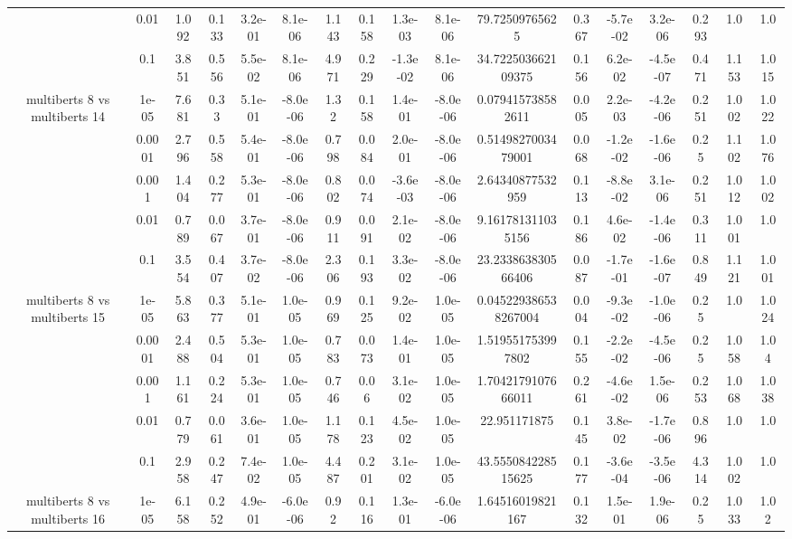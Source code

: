 \begin{tabular}{|c|c|c|c|c|c|c|c|c|c|c|c|c|c|c|c|c|}
 & 0.01 & 1.092 & 0.133 & 3.2e-01 & 8.1e-06 & 1.143 & 0.158 & 1.3e-03 & 8.1e-06 & 79.72509765625 & 0.367 & -5.7e-02 & 3.2e-06 & 0.293 & 1.0 & 1.0 \\
 & 0.1 & 3.851 & 0.556 & 5.5e-02 & 8.1e-06 & 4.971 & 0.229 & -1.3e-02 & 8.1e-06 & 34.722503662109375 & 0.156 & 6.2e-02 & -4.5e-07 & 0.471 & 1.153 & 1.015 \\
\hline
\multirow{5}{*}{multiberts 8 vs multiberts 14} & 1e-05 & 7.681 & 0.33 & 5.1e-01 & -8.0e-06 & 1.32 & 0.158 & 1.4e-01 & -8.0e-06 & 0.079415738582611 & 0.005 & 2.2e-03 & -4.2e-06 & 0.251 & 1.002 & 1.022 \\
 & 0.0001 & 2.796 & 0.558 & 5.4e-01 & -8.0e-06 & 0.798 & 0.084 & 2.0e-01 & -8.0e-06 & 0.5149827003479001 & 0.068 & -1.2e-02 & -1.6e-06 & 0.25 & 1.102 & 1.076 \\
 & 0.001 & 1.404 & 0.277 & 5.3e-01 & -8.0e-06 & 0.802 & 0.074 & -3.6e-03 & -8.0e-06 & 2.64340877532959 & 0.113 & -8.8e-02 & 3.1e-06 & 0.251 & 1.012 & 1.002 \\
 & 0.01 & 0.789 & 0.067 & 3.7e-01 & -8.0e-06 & 0.911 & 0.091 & 2.1e-02 & -8.0e-06 & 9.161781311035156 & 0.186 & 4.6e-02 & -1.4e-06 & 0.311 & 1.001 & 1.0 \\
 & 0.1 & 3.554 & 0.407 & 3.7e-02 & -8.0e-06 & 2.306 & 0.193 & 3.3e-02 & -8.0e-06 & 23.233863830566406 & 0.087 & -1.7e-01 & -1.6e-07 & 0.849 & 1.121 & 1.001 \\
\hline
\multirow{5}{*}{multiberts 8 vs multiberts 15} & 1e-05 & 5.863 & 0.377 & 5.1e-01 & 1.0e-05 & 0.969 & 0.125 & 9.2e-02 & 1.0e-05 & 0.045229386538267004 & 0.004 & -9.3e-02 & -1.0e-06 & 0.25 & 1.0 & 1.024 \\
 & 0.0001 & 2.488 & 0.504 & 5.3e-01 & 1.0e-05 & 0.783 & 0.073 & 1.4e-01 & 1.0e-05 & 1.519551753997802 & 0.155 & -2.2e-02 & -4.5e-06 & 0.25 & 1.058 & 1.04 \\
 & 0.001 & 1.161 & 0.224 & 5.3e-01 & 1.0e-05 & 0.746 & 0.06 & 3.1e-02 & 1.0e-05 & 1.7042179107666011 & 0.261 & -4.6e-02 & 1.5e-06 & 0.253 & 1.068 & 1.038 \\
 & 0.01 & 0.779 & 0.061 & 3.6e-01 & 1.0e-05 & 1.178 & 0.123 & 4.5e-02 & 1.0e-05 & 22.951171875 & 0.145 & 3.8e-02 & -1.7e-06 & 0.896 & 1.0 & 1.0 \\
 & 0.1 & 2.958 & 0.247 & 7.4e-02 & 1.0e-05 & 4.487 & 0.201 & 3.1e-02 & 1.0e-05 & 43.555084228515625 & 0.177 & -3.6e-04 & -3.5e-06 & 4.314 & 1.002 & 1.0 \\
\hline
\multirow{5}{*}{multiberts 8 vs multiberts 16} & 1e-05 & 6.158 & 0.252 & 4.9e-01 & -6.0e-06 & 0.92 & 0.116 & 1.3e-01 & -6.0e-06 & 1.64516019821167 & 0.132 & 1.5e-01 & 1.9e-06 & 0.25 & 1.033 & 1.02 \\

\end{tabular}
